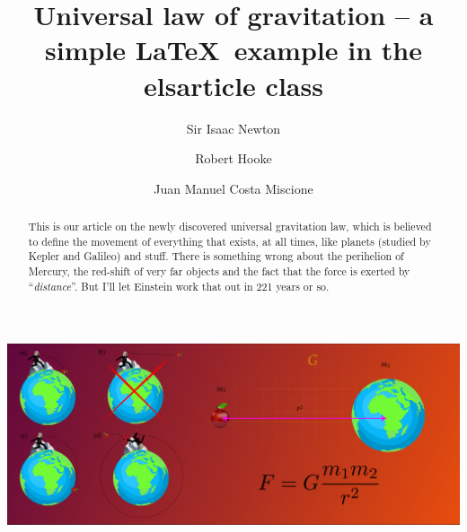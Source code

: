 \documentclass[preprint,12pt]{elsarticle}
\begin{document}
\begin{frontmatter}

\title{Universal law of gravitation -- a simple \LaTeX\ example in the elsarticle class}

\author[1]{Sir Isaac Newton}

\author[2]{Robert Hooke}

\author[3]{Juan Manuel Costa Miscione}


            


            
\begin{abstract}
This is our article on the newly discovered universal gravitation law, which is believed to define the movement of everything that exists, at all times, like planets (studied by Kepler and Galileo) and stuff. There is something wrong about the perihelion of Mercury, the red-shift of very far objects and the fact that the force is exerted by ``\emph{distance}''. But I'll let Einstein work that out in 221 years or so.
\end{abstract}

\begin{graphicalabstract}
\includegraphics[width=\textwidth]{GA.pdf}
\end{graphicalabstract}


\end{frontmatter}
\end{document}
